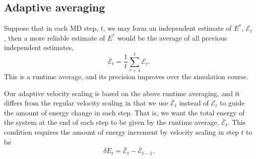 \documentclass[reprint]{revtex4-1}
\begin{document}
\subsection{Adaptive averaging}



Suppose that in each MD step, $t$,
we may form an independent estimate of $E^*$,
$\mathcal E_t$,
then a more reliable estimate of $E^*$
would be the average of
all previous independent estimates,
%
\begin{equation}
  \bar{\mathcal E}_t
  =
  \frac 1 t
  \sum_{\tau = 1}^t
    \mathcal E_\tau
  .
  \label{eq:Epsave}
\end{equation}
%
This is a runtime average,
and its precision improves over the simulation course.



Our adaptive velocity scaling is based on
the above runtime averaging,
and it differs from the regular velocity scaling
in that we use $\bar{\mathcal E}_t$
instead of $\mathcal E_t$
to guide the amount of energy change in each step.
%
That is, we want
the total energy of the system
at the end of each step
to be given by
the runtime average, $\bar{\mathcal E}_t$.
%
This condition requires the amount of energy increment
by velocity scaling in step $t$ to be
%
\begin{equation}
  \delta E_t
  =
  \bar{\mathcal E}_t - \bar{\mathcal E}_{t - 1}
  .
  \label{eq:dE_adaptive}
\end{equation}
\end{document}
